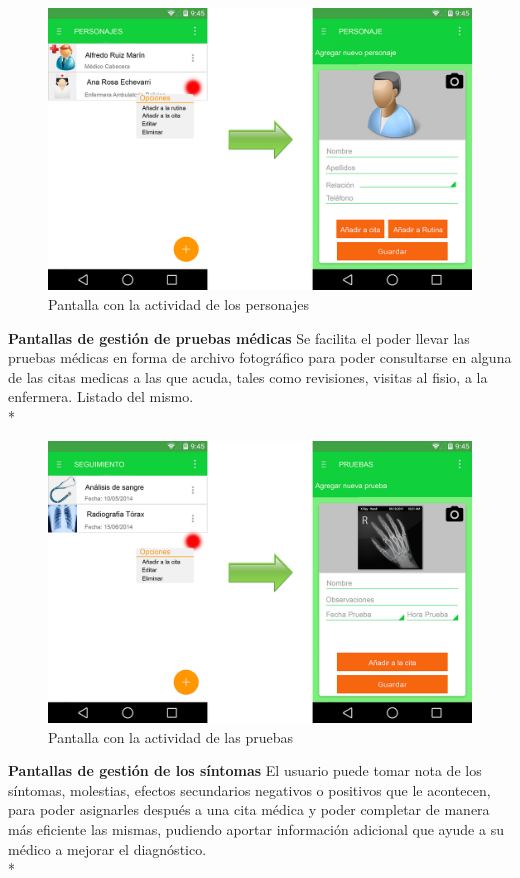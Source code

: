 \documentclass[../pfc.tex]{subfiles}
\begin{document}
			
			\begin{figure}[h]
				\centering
				\includegraphics[width=0.7\linewidth]{../images/personajes}
				\caption{Pantalla con la actividad de los personajes}
				\label{fig:personajes}
			\end{figure}
			
			
			\textbf{Pantallas de gestión de pruebas médicas}
			Se facilita el poder llevar las pruebas médicas en forma de archivo fotográfico para poder consultarse en alguna de las citas medicas a las que acuda, tales como revisiones, visitas al fisio, a la enfermera. Listado del mismo.\\*
			
			\begin{figure}[h]
				\centering
				\includegraphics[width=0.7\linewidth]{../images/pruebas}
				\caption{Pantalla con la actividad de las pruebas}
				\label{fig:pruebas}
			\end{figure}
			
			
			\textbf{Pantallas de gestión de los síntomas}
			El usuario puede tomar nota de los síntomas, molestias, efectos secundarios negativos o positivos que le acontecen, para poder asignarles después a una cita médica y poder completar de manera más eficiente las mismas, pudiendo aportar información adicional que ayude a su médico a mejorar el diagnóstico.\\*
			
\end{document}
